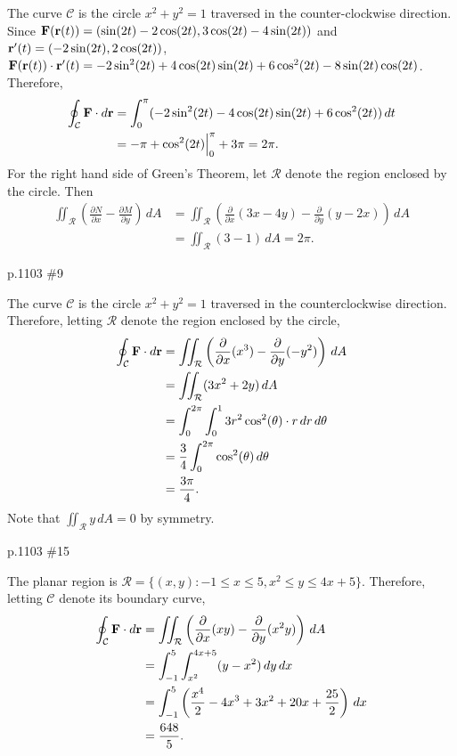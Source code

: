 \begin{pracsol}
  The curve $\mathcal C$ is the circle $x^2+y^2=1$ traversed in the counter-clockwise direction. Since $\mathbf F(\mathbf r(t))=(\sin(2t)-2\cos(2t),3\cos(2t)-4\sin(2t))$ and $\mathbf r'(t)=(-2\sin(2t),2\cos(2t))$, $\mathbf F(\mathbf r(t))\cdot\mathbf r'(t)=-2\sin^2(2t)+4\cos(2t)\sin(2t)+6\cos^2(2t)-8\sin(2t)\cos(2t)$. Therefore,
  \[\begin{split}
    \oint_{\mathcal C}\mathbf F\cdot d\mathbf r &= \int_0^\pi(-2\sin^2(2t)-4\cos(2t)\sin(2t)+6\cos^2(2t))\,dt\\
    &= -\pi+\cos^2(2t)\Big|_0^\pi+3\pi=2\pi.
  \end{split}\]
  For the right hand side of Green's Theorem, let $\mathcal R$ denote the region enclosed by the circle. Then
  \[\begin{split}
    \iint_{\mathcal R}\left(\frac{\partial N}{\partial x}-\frac{\partial M}{\partial y}\right)\,dA &= \iint_{\mathcal R}\left(\frac{\partial}{\partial x}(3x-4y)-\frac{\partial}{\partial y}(y-2x)\right)\,dA\\
    &= \iint_{\mathcal{R}}(3-1)\,dA=2\pi.
  \end{split}\]
\end{pracsol}
\begin{practice}p.1103 \#9\end{practice}
\begin{pracsol}
  The curve $\mathcal C$ is the circle $x^2+y^2=1$ traversed in the counterclockwise direction. Therefore, letting $\mathcal R$ denote the region enclosed by the circle,
  \[\begin{split}
    \oint_{\mathcal C}\mathbf F\cdot d\mathbf r &= \iint_{\mathcal R}\left(\frac{\partial}{\partial x}(x^3)-\frac{\partial}{\partial y}(-y^2)\right)\,dA\\
    &= \iint_{\mathcal R}(3x^2+2y)\,dA\\
    &= \int_0^{2\pi}\int_0^1 3r^2\cos^2(\theta)\cdot r\,dr\,d\theta\\
    &= \frac34\int_0^{2\pi}\cos^2(\theta)\,d\theta\\
    &= \frac{3\pi}{4}.
  \end{split}\]
  Note that $\iint_{\mathcal R}y\,dA=0$ by symmetry.
\end{pracsol}
\begin{practice}p.1103 \#15\end{practice}
\begin{pracsol}
  The planar region is $\mathcal R=\{(x,y):-1\leq x\leq 5,x^2\leq y\leq 4x+5\}$. Therefore, letting $\mathcal C$ denote its boundary curve,
  \[\begin{split}
    \oint_{\mathcal C}\mathbf F\cdot d\mathbf r &= \iint_{\mathcal R}\left(\frac{\partial}{\partial x}(xy)-\frac{\partial}{\partial y}(x^2y)\right)\,dA\\
    &= \int_{-1}^5\int_{x^2}^{4x+5}(y-x^2)\,dy\,dx\\
    &= \int_{-1}^5\left(\frac{x^4}{2}-4x^3+3x^2+20x+\frac{25}{2}\right)\,dx\\
    &= \frac{648}{5}.
  \end{split}\]
\end{pracsol}
